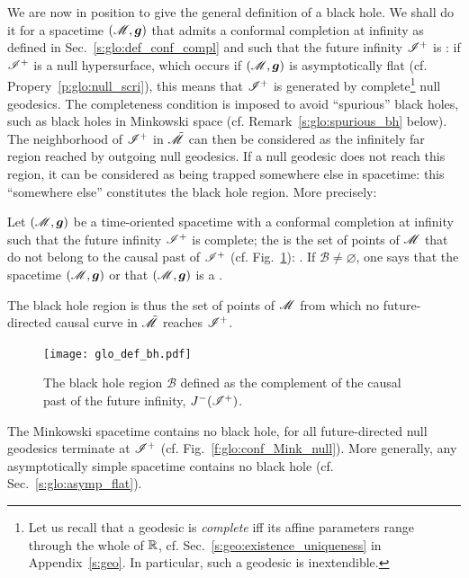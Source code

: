 We are now in position to give the general definition of a black hole.
We shall do it for a spacetime $(\mathscr{M},\bm{g})$ that admits a conformal completion
at infinity as defined in Sec.~\ref{s:glo:def_conf_compl} and
such that the future infinity $\mathscr{I}^+$ is
: if $\mathscr{I}^+$
is a null hypersurface, which occurs if $(\mathscr{M},\bm{g})$ is asymptotically flat
(cf. Propery~\ref{p:glo:null_scri}),
this means that $\mathscr{I}^+$ is generated by complete\footnote{Let us recall
that a geodesic is \emph{complete} iff its affine parameters range through the whole of
$\mathbb{R}$, cf. Sec.~\ref{s:geo:existence_uniqueness}
in Appendix~\ref{s:geo}. In particular, such a geodesic is inextendible.}
null geodesics.
The completeness condition is imposed to avoid ``spurious'' black holes,
such as black holes in Minkowski space (cf. Remark~\ref{s:glo:spurious_bh} below).
The neighborhood of $\mathscr{I}^+$
in $\tilde{\mathscr{M}}$ can then be considered as the infinitely far region
reached by outgoing null geodesics. If a null geodesic does not reach this
region, it can be considered as being trapped somewhere else in spacetime: this
``somewhere else'' constitutes the black hole region. More precisely:

\begin{greybox}
Let $(\mathscr{M},\bm{g})$ be a time-oriented spacetime with a conformal completion at infinity
such that the future infinity $\mathscr{I}^+$ is complete;
the 
is the set of points of $\mathscr{M}$ that do not belong to the causal past of $\mathscr{I}^+$ (cf. Fig.~\ref{f:glo:def_bh}):
\be \label{e:glo:def_BH}
     .
\ee
If $\mathscr{B} \neq \varnothing$, one says
that the spacetime $(\mathscr{M},\bm{g})$  or that
$(\mathscr{M},\bm{g})$ is a .
\end{greybox}
The black hole region is thus the set of points of $\mathscr{M}$
from which no future-directed causal curve in $\tilde{\mathscr{M}}$ reaches $\mathscr{I}^+$.


\begin{figure}
\centerline{\texttt{[image: glo\_def\_bh.pdf]}}
\caption[]{\label{f:glo:def_bh} \footnotesize
The black hole region $\mathscr{B}$ defined as the complement of
the causal past of the future infinity, $J^-(\mathscr{I}^+)$.}
\end{figure}


\begin{example}
The Minkowski spacetime contains no black hole, for all future-directed null geodesics
terminate at $\mathscr{I}^+$ (cf. Fig.~\ref{f:glo:conf_Mink_null}).
More generally, any asymptotically simple spacetime contains no black hole
(cf. Sec.~\ref{s:glo:asymp_flat}).
\end{example}

